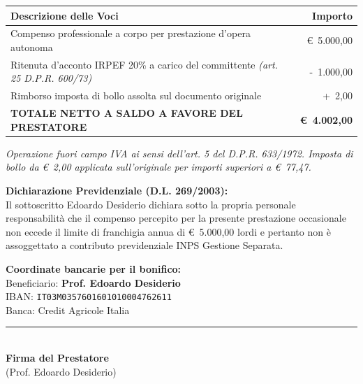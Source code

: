 \documentclass[11pt,a4paper]{article}
\begin{document}
\vspace{1.2em}

\noindent
\begin{tabularx}{\textwidth}{@{} X r @{}}
  \toprule
  \textbf{Descrizione delle Voci} & \textbf{Importo} \\
  \midrule
  Compenso professionale a corpo per prestazione d'opera autonoma & \euro~5.000,00 \\
  Ritenuta d'acconto IRPEF 20\% a carico del committente \emph{(art. 25 D.P.R. 600/73)} & -\text{\euro}~1.000,00 \\
  Rimborso imposta di bollo assolta sul documento originale & +\text{\euro}~2,00 \\
  \midrule[\heavyrulewidth]
  \textbf{TOTALE NETTO A SALDO A FAVORE DEL PRESTATORE} & \textbf{\euro~4.002,00} \\
  \bottomrule
\end{tabularx}

\vspace{0.8em}
\noindent
{\footnotesize\itshape Operazione fuori campo IVA ai sensi dell'art. 5 del D.P.R. 633/1972. Imposta di bollo da \euro~2,00 applicata sull'originale per importi superiori a \euro~77,47.}

\vspace{1.5em}

\noindent
\textbf{Dichiarazione Previdenziale (D.L. 269/2003):}\\
{\small Il sottoscritto Edoardo Desiderio dichiara sotto la propria personale responsabilità che il compenso percepito per la presente prestazione occasionale non eccede il limite di franchigia annua di \euro~5.000,00 lordi e pertanto non è assoggettato a contributo previdenziale INPS Gestione Separata.}

\vspace{2.5em}

\noindent
\begin{minipage}[b]{0.52\textwidth}
  \textbf{Coordinate bancarie per il bonifico:}\\
  Beneficiario: \textbf{Prof. Edoardo Desiderio}\\
  IBAN: \texttt{IT03M0357601601010004762611}\\
  Banca: Credit Agricole Italia
\end{minipage}
\hfill
\begin{minipage}[b]{0.42\textwidth}
  \centering
  \rule{0.85\textwidth}{0.5pt}\\[0.3em]
  \textbf{Firma del Prestatore}\\
  {\footnotesize (Prof. Edoardo Desiderio)}
\end{minipage}
\end{document}
